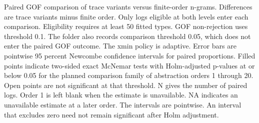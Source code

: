 Paired GOF comparison of trace variants versus finite-order n-grams. Differences are trace variants minus finite order. Only logs eligible at both levels enter each comparison. Eligibility requires at least 50 fitted types. GOF non-rejection uses threshold 0.1. The folder also records comparison threshold 0.05, which does not enter the paired GOF outcome. The xmin policy is adaptive. Error bars are pointwise 95 percent Newcombe confidence intervals for paired proportions. Filled points indicate two-sided exact McNemar tests with Holm-adjusted p-values at or below 0.05 for the planned comparison family of abstraction orders 1 through 20. Open points are not significant at that threshold. N gives the number of paired logs. Order 1 is left blank when the estimate is unavailable. NA indicates an unavailable estimate at a later order. The intervals are pointwise. An interval that excludes zero need not remain significant after Holm adjustment.
